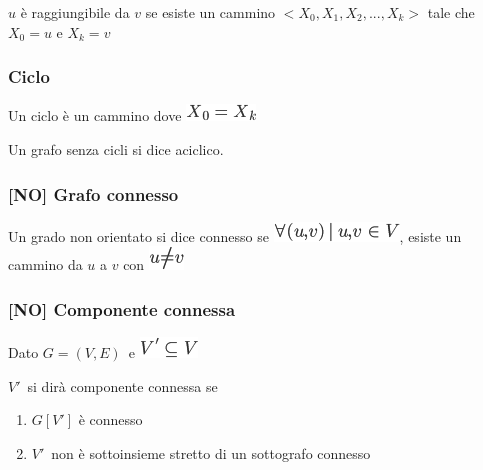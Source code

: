 \documentclass{article}
\providecommand{\tightlist}{%
  \setlength{\itemsep}{0pt}\setlength{\parskip}{0pt}}
\begin{document}
$u$ è raggiungibile da $v$ se esiste un cammino $<X_0,X_1,X_2,...,X_k>$ tale che $X_0 = u$ e $X_k = v$

\hypertarget{h.4fm287mz4am5}{\subsubsection{\texorpdfstring{{Ciclo}}{Ciclo}}\label{h.4fm287mz4am5}}

{Un ciclo è un cammino dove }\includegraphics{images/image353.png}

{Un grafo senza cicli si dice }{aciclico.}

\hypertarget{h.rpdf8j1vq7g0}{\subsubsection{\texorpdfstring{{{[}NO{]}
Grafo connesso}}{{[}NO{]} Grafo connesso}}\label{h.rpdf8j1vq7g0}}

{Un grado non orientato si dice connesso se }\includegraphics{images/image354.png}{, esiste un cammino da $u$ a $v$ con }\includegraphics{images/image355.png}

\hypertarget{h.iejp6ankfctp}{\subsubsection{\texorpdfstring{{{[}NO{]}
Componente
connessa}}{{[}NO{]} Componente connessa}}\label{h.iejp6ankfctp}}

{Dato }$G=(V,E)${~e
}\includegraphics{images/image342.png}

$V'${~si dirà componente connessa se }

\begin{enumerate}
\tightlist
\item
  {$G[V']$ è connesso}
\item
  $V'${~non è sottoinsieme stretto di un sottografo connesso}
\end{enumerate}

{}
\end{document}

